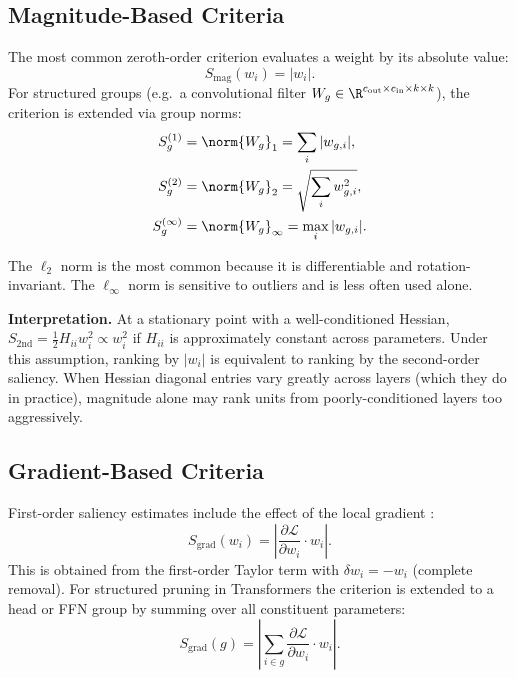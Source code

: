 \subsection{Magnitude-Based Criteria}

The most common zeroth-order criterion evaluates a weight by its absolute value:
\begin{equation}
	S_{\mathrm{mag}}(w_i) = |w_i|.
	\label{eq:mag}
\end{equation}
For structured groups (e.g.\ a convolutional filter
$W_g \in \R^{c_\mathrm{out} \times c_\mathrm{in} \times k \times k}$), the
criterion is extended via group norms:
\begin{align}
	S_g^{(1)} &= \norm{W_g}_1 = \sum_{i} |w_{g,i}|, \label{eq:mag_l1} \\
	S_g^{(2)} &= \norm{W_g}_2 = \sqrt{\sum_{i} w_{g,i}^2}, \label{eq:mag_l2} \\
	S_g^{(\infty)} &= \norm{W_g}_\infty = \max_i |w_{g,i}|. \label{eq:mag_linf}
\end{align}

The $\ell_2$ norm is the most common because it is differentiable and
rotation-invariant.  The $\ell_\infty$ norm is sensitive to outliers and
is less often used alone.

\textbf{Interpretation.} At a stationary point with a well-conditioned
Hessian, $S_{\mathrm{2nd}} = \tfrac{1}{2} H_{ii} w_i^2 \propto w_i^2$ if
$H_{ii}$ is approximately constant across parameters.  Under this assumption,
ranking by $|w_i|$ is equivalent to ranking by the second-order saliency.
When Hessian diagonal entries vary greatly across layers (which they do in
practice), magnitude alone may rank units from poorly-conditioned layers too
aggressively.

\subsection{Gradient-Based Criteria}

First-order saliency estimates include the effect of the local gradient \cite{molchanov2017variational}:
\begin{equation}
	S_{\mathrm{grad}}(w_i)
	= \left|\frac{\partial\mathcal{L}}{\partial w_i}\cdot w_i\right|.
	\label{eq:grad}
\end{equation}
This is obtained from the first-order Taylor term with $\delta w_i = -w_i$
(complete removal).  For structured pruning in Transformers the criterion is
extended to a head or FFN group by summing over all constituent parameters:
\begin{equation}
	S_{\mathrm{grad}}(g)
	= \left|\sum_{i \in g}\frac{\partial\mathcal{L}}{\partial w_i}\cdot w_i\right|.
	\label{eq:grad_group}
\end{equation}

